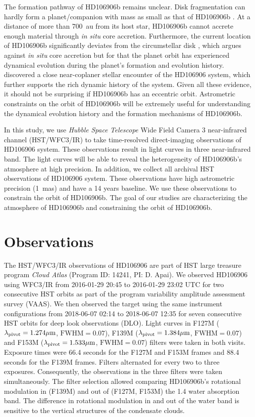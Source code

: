 \documentclass[twocolumn]{aastex62}
\begin{document}
The formation pathway of HD106906b remains unclear. Disk fragmentation can hardly form a planet/companion with mass as small as that of HD106906b \citep[e.g.,][]{Kratter2010}. At a distance of more than 700~au from its host star, HD106906b cannot accrete enough material through \emph{in situ} core accretion. Furthermore, the current location of HD106906b significantly deviates from the circumstellar disk \citep{Bailey2013,Kalas2015}, which argues against \emph{in situ} core accretion but for that the planet orbit has experienced dynamical evolution during the planet's formation and evolution history. \citep{DeRosa2019} discovered a close near-coplaner stellar encounter of the HD106906 system, which further supports the rich dynamic history of the system. Given all these evidence, it should not be surprising if HD106906b has an eccentric orbit. Astrometric constraints on the orbit of HD106906b will be extremely useful for understanding the dynamical evolution history and the formation mechanisms of HD106906b.

In this study, we use \emph{Hubble Space Telescope} Wide Field Camera 3 near-infrared channel (HST/WFC3/IR) to take time-resolved direct-imaging observations of HD106906 system. These observations result in light curves in three near-infrared band. The light curves will be able to reveal the heterogeneity of HD106906b's atmosphere at high precision. In addition, we collect all archival HST observations of HD106906 system. These observations have high astrometric precision (1~mas) and have a 14 years baseline. We use these observations to constrain the orbit of HD106906b. The goal of our studies are  characterizing the atmosphere of HD106906b and constraining the orbit of HD106906b.

\section{Observations}
The HST/WFC3/IR observations of HD106906 are part of HST large treasure program \emph{Cloud Atlas} (Program ID: 14241, PI: D. Apai). We observed HD106906 using WFC3/IR from 2016-01-29 20:45 to 2016-01-29 23:02 UTC for two consecutive HST orbits as part of the program variability amplitude assessment survey (VAAS). We then  observed  the target using the same instrument configurations from 2018-06-07 02:14 to 2018-06-07 12:35 for seven consecutive HST orbits for deep look observations (DLO). Light curves in F127M ($\lambda_{\mathrm{pivot}}=1.274\mbox{$\mu$m}$, $\mathrm{FWHM}=0.07$), F139M ($\lambda_{\mathrm{pivot}}=1.384\mbox{$\mu$m}$, $\mathrm{FWHM}=0.07$) and F153M ($\lambda_{\mathrm{pivot}}=1.533\mbox{$\mu$m}$, $\mathrm{FWHM}=0.07$) filters were taken in both visits. Exposure times were 66.4 seconds for the F127M and F153M frames and 88.4 seconds for the F139M frames. Filters alternated for every two to three exposures. Consequently, the observations in the three filters were taken simultaneously. The filter selection allowed comparing HD106906b's rotational modulation in (F139M) and out of (F127M, F153M) the 1.4 \micron{} water absorption band. The difference in rotational modulation in and out of the water band is sensitive to the vertical structures of the condensate clouds. 
\end{document}
